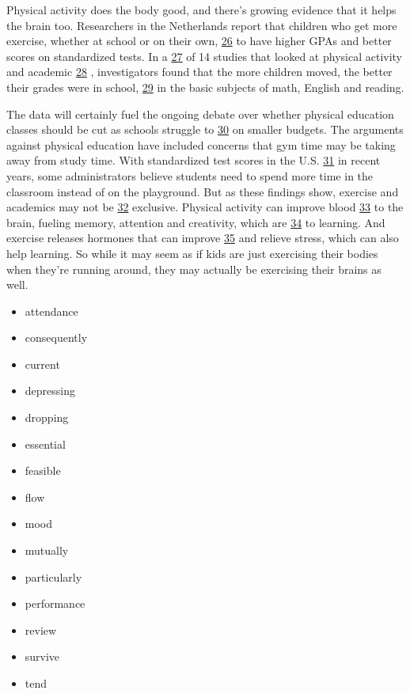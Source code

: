 \documentclass[UTF8,11pt]{ctexart}
\begin{document}
Physical activity does the body good, and there's growing evidence that it helps the brain too. Researchers in the Netherlands report that children who get more exercise, whether at school or on their own, \uline{26} to have higher GPAs and better scores on standardized tests. In a \uline{27} of 14 studies that looked at physical activity and academic \uline{28} , investigators found that the more children moved, the better their grades were in school, \uline{29} in the basic subjects of math, English and reading.


The data will certainly fuel the ongoing debate over whether physical education classes should be cut as schools struggle to \uline{30} on smaller budgets. The arguments against physical education have included concerns that gym time may be taking away from study time. With standardized test scores in the U.S. \uline{31} in recent years, some administrators believe students need to spend more time in the classroom instead of on the playground. But as these findings show, exercise and academics may not be \uline{32} exclusive. Physical activity can improve blood \uline{33} to the brain, fueling memory, attention and creativity, which are \uline{34} to learning. And exercise releases hormones that can improve \uline{35} and relieve stress, which can also help learning. So while it may seem as if kids are just exercising their bodies when they're running around, they may actually be exercising their brains as well.


\begin{itemize}[leftmargin=2em,itemsep=.2em,topsep=.4em]\item[A.] attendance
\item[B.] consequently
\item[C.] current
\item[D.] depressing
\item[E.] dropping
\item[F.] essential
\item[G.] feasible
\item[H.] flow
\item[I.] mood
\item[J.] mutually
\item[K.] particularly
\item[L.] performance
\item[M.] review
\item[N.] survive
\item[O.] tend
\end{itemize}
\end{document}
